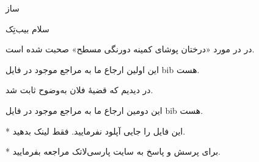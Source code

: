 \documentclass[12pt]{article}
\begin{document}
‌ساز

سلام بیب‌تِک
\hfill 
{}

\vskip 10mm

در 
\cite{Vahedi87}
 در مورد «درختان پوشای کمینه دورنگی مسطح» صحبت شده است. 

این اولین ارجاع ما به مراجع موجود در فایل bib هست.

در 
\cite{Gonzalez02image}
 دیدیم که قضیهٔ فلان به‌وضوح  ثابت شد.

این دومین  ارجاع ما به مراجع موجود در فایل bib هست.


\vskip 20mm

* این فایل را جایی آپلود نفرمایید. فقط لینک بدهید. 

* برای پرسش و پاسخ به سایت پارسی‌لاتک مراجعه بفرمایید. 


\end{document}
